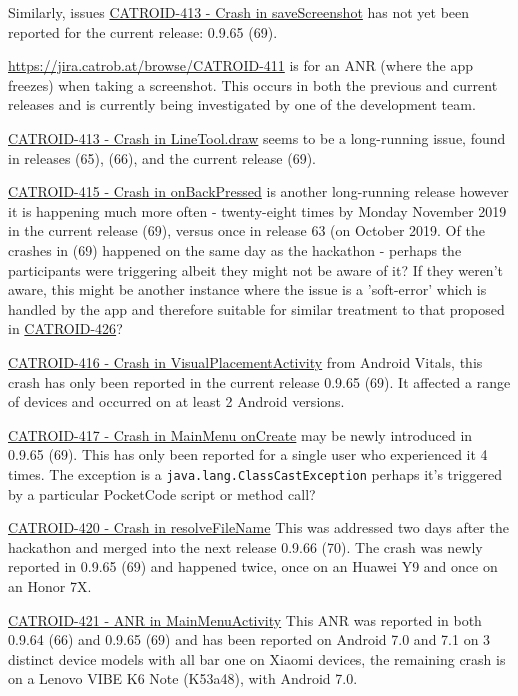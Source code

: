 Similarly, issues \href{https://jira.catrob.at/browse/CATROID-413}{CATROID-413 - Crash in saveScreenshot} has not yet been reported for the current release: 0.9.65 (69).

\href{CATROID-411}{https://jira.catrob.at/browse/CATROID-411} is for an ANR (where the app freezes) when taking a screenshot. This occurs in both the previous and current releases and is currently being investigated by one of the development team.

\href{https://jira.catrob.at/browse/CATROID-413}{CATROID-413 - Crash in LineTool.draw} seems to be a long-running issue, found in releases (65), (66), and the current release (69).

\href{https://jira.catrob.at/browse/CATROID-415}{CATROID-415 - Crash in onBackPressed} is another long-running release however it is happening much more often - twenty-eight times by Monday  November 2019 in the current release (69), versus once in release 63 (on  October 2019. Of the crashes in (69) happened on the same day as the hackathon - perhaps the participants were triggering albeit they might not be aware of it? If they weren't aware, this might be another instance where the issue is a 'soft-error' which is handled by the app and therefore suitable for similar treatment to that proposed in \href{https://jira.catrob.at/browse/CATROID-426}{CATROID-426}?

\href{https://jira.catrob.at/browse/CATROID-416}{CATROID-416 - Crash in VisualPlacementActivity} from Android Vitals, this crash has only been reported in the current release 0.9.65 (69). It affected a range of devices and occurred on at least 2 Android versions.

\href{https://jira.catrob.at/browse/CATROID-417}{CATROID-417 - Crash in MainMenu onCreate} may be newly introduced in 0.9.65 (69). This has only been reported for a single user who experienced it 4 times. The exception is a \texttt{java.lang.ClassCastException} perhaps it's triggered by a particular PocketCode script or method call?

\href{https://jira.catrob.at/browse/CATROID-420}{CATROID-420 - Crash in resolveFileName} This was addressed two days after the hackathon and merged into the next release 0.9.66 (70). The crash was newly reported in 0.9.65 (69) and happened twice, once on an Huawei Y9 and once on an Honor 7X.

\href{https://jira.catrob.at/browse/CATROID-421}{CATROID-421 - ANR in MainMenuActivity} This ANR was reported in both 0.9.64 (66) and 0.9.65 (69) and has been reported on Android 7.0 and 7.1 on 3 distinct device models with all bar one on Xiaomi devices, the remaining crash is on a Lenovo VIBE K6 Note (K53a48), with Android 7.0.


